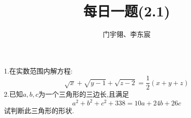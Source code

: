 \documentclass[UTF8]{ctexart}
\title{每日一题(2.1)}
\author{门宇翎、李东宸}
\begin{document}
\maketitle
\begin{flushleft}
1.在实数范围内解方程:
\[\sqrt{x}+\sqrt{y-1}+\sqrt{z-2}=\frac{1}{2}(x+y+z)\]
2.已知$a,b,c$为一个三角形的三边长,且满足
\[a^2+b^2+c^2+338=10a+24b+26c\]
试判断此三角形的形状.
\end{flushleft}
\end{document}
